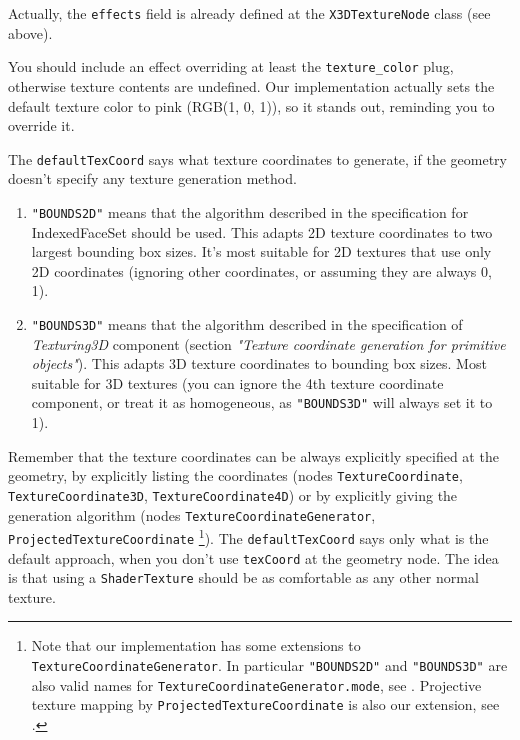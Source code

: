 \documentclass{acmsiggraph}                     %
\newenvironment{myenumerate}
{\begin{enumerate}
  \setlength{\itemsep}{0pt}
  \setlength{\parskip}{0pt}
  \setlength{\parsep}{0pt}}
{\end{enumerate}}
\begin{document}
Actually, the \texttt{effects} field is already defined at
the \texttt{X3DTextureNode} class (see above).

You should include an effect overriding at least the \texttt{texture\_color}
plug, otherwise texture contents are undefined. Our implementation actually
sets the default texture color to pink (RGB(1, 0, 1)), so it stands out,
reminding you to override it.

The \texttt{defaultTexCoord} says what texture coordinates to generate,
if the geometry doesn't specify any texture generation method.

\begin{myenumerate}

\item
  \texttt{"BOUNDS2D"} means that the algorithm described in the specification
  for {IndexedFaceSet} should be used. This adapts 2D texture coordinates
  to two largest bounding box sizes.
  It's most suitable for 2D textures that use only 2D coordinates
  (ignoring other coordinates, or assuming they are always 0, 1).

\item
  \texttt{"BOUNDS3D"} means that the algorithm described in the specification
  of \textit{Texturing3D} component (section \textit{"Texture coordinate generation for primitive objects"}).
  This adapts 3D texture coordinates to bounding box sizes.
  Most suitable for 3D textures (you can ignore the 4th texture coordinate
  component, or treat it as homogeneous, as \texttt{"BOUNDS3D"} will always
  set it to 1).

\end{myenumerate}

Remember that the texture coordinates can be always explicitly specified
at the geometry, by explicitly listing the coordinates (nodes
\texttt{TextureCoordinate}, \texttt{TextureCoordinate3D},
\texttt{TextureCoordinate4D}) or by explicitly giving the generation
algorithm (nodes \texttt{TextureCoordinateGenerator},
\texttt{ProjectedTextureCoordinate} \footnote{
    Note that our implementation has some extensions
    to \texttt{TextureCoordinateGenerator}. In particular
    \texttt{"BOUNDS2D"} and \texttt{"BOUNDS3D"} are also valid names for
    \texttt{TextureCoordinateGenerator.mode}, see
    \cite{vrmleng:texcoordbounds}.
    Projective texture mapping by \texttt{ProjectedTextureCoordinate}
    is also our extension, see \cite{vrmleng:projectivetexturing}.}).
The \texttt{defaultTexCoord} says only what is the default approach,
when you don't use \texttt{texCoord} at the geometry node.
The idea is that using a \texttt{ShaderTexture} should be as comfortable
as any other normal texture.
\end{document}
